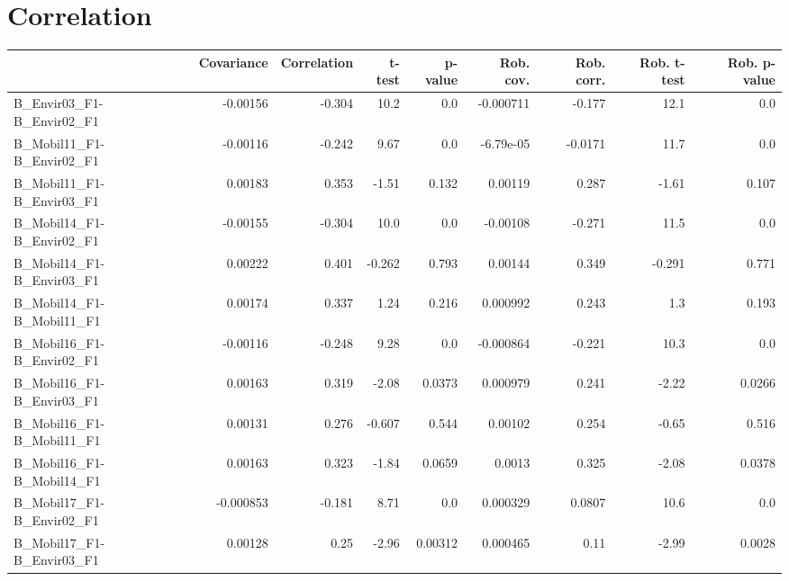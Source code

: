 \section{Correlation}
\begin{tabular}{lrrrrrrrr}
\toprule
{} &  Covariance &  Correlation &  t-test &  p-value &  Rob. cov. &  Rob. corr. &  Rob. t-test &  Rob. p-value \\
\midrule
B\_Envir03\_F1-B\_Envir02\_F1                 &    -0.00156 &       -0.304 &    10.2 &      0.0 &  -0.000711 &      -0.177 &         12.1 &           0.0 \\
B\_Mobil11\_F1-B\_Envir02\_F1                 &    -0.00116 &       -0.242 &    9.67 &      0.0 &  -6.79e-05 &     -0.0171 &         11.7 &           0.0 \\
B\_Mobil11\_F1-B\_Envir03\_F1                 &     0.00183 &        0.353 &   -1.51 &    0.132 &    0.00119 &       0.287 &        -1.61 &         0.107 \\
B\_Mobil14\_F1-B\_Envir02\_F1                 &    -0.00155 &       -0.304 &    10.0 &      0.0 &   -0.00108 &      -0.271 &         11.5 &           0.0 \\
B\_Mobil14\_F1-B\_Envir03\_F1                 &     0.00222 &        0.401 &  -0.262 &    0.793 &    0.00144 &       0.349 &       -0.291 &         0.771 \\
B\_Mobil14\_F1-B\_Mobil11\_F1                 &     0.00174 &        0.337 &    1.24 &    0.216 &   0.000992 &       0.243 &          1.3 &         0.193 \\
B\_Mobil16\_F1-B\_Envir02\_F1                 &    -0.00116 &       -0.248 &    9.28 &      0.0 &  -0.000864 &      -0.221 &         10.3 &           0.0 \\
B\_Mobil16\_F1-B\_Envir03\_F1                 &     0.00163 &        0.319 &   -2.08 &   0.0373 &   0.000979 &       0.241 &        -2.22 &        0.0266 \\
B\_Mobil16\_F1-B\_Mobil11\_F1                 &     0.00131 &        0.276 &  -0.607 &    0.544 &    0.00102 &       0.254 &        -0.65 &         0.516 \\
B\_Mobil16\_F1-B\_Mobil14\_F1                 &     0.00163 &        0.323 &   -1.84 &   0.0659 &     0.0013 &       0.325 &        -2.08 &        0.0378 \\
B\_Mobil17\_F1-B\_Envir02\_F1                 &   -0.000853 &       -0.181 &    8.71 &      0.0 &   0.000329 &      0.0807 &         10.6 &           0.0 \\
B\_Mobil17\_F1-B\_Envir03\_F1                 &     0.00128 &         0.25 &   -2.96 &  0.00312 &   0.000465 &        0.11 &        -2.99 &        0.0028 \\

\end{tabular}
